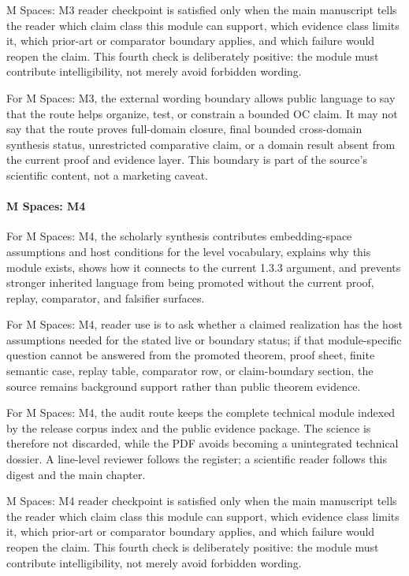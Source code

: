 M Spaces: M3 reader checkpoint is satisfied only when the main manuscript tells the reader which claim class this module can support, which evidence class limits it, which prior-art or comparator boundary applies, and which failure would reopen the claim. This fourth check is deliberately positive: the module must contribute intelligibility, not merely avoid forbidden wording.


For M Spaces: M3, the external wording boundary allows public language to say that the route helps organize, test, or constrain a bounded OC claim. It may not say that the route proves full-domain closure, final bounded cross-domain synthesis status, unrestricted comparative claim, or a domain result absent from the current proof and evidence layer. This boundary is part of the source's scientific content, not a marketing caveat.


\paragraph{M Spaces: M4}

For M Spaces: M4, the scholarly synthesis contributes embedding-space assumptions and host conditions for the level vocabulary, explains why this module exists, shows how it connects to the current 1.3.3 argument, and prevents stronger inherited language from being promoted without the current proof, replay, comparator, and falsifier surfaces.


For M Spaces: M4, reader use is to ask whether a claimed realization has the host assumptions needed for the stated live or boundary status; if that module-specific question cannot be answered from the promoted theorem, proof sheet, finite semantic case, replay table, comparator row, or claim-boundary section, the source remains background support rather than public theorem evidence.


For M Spaces: M4, the audit route keeps the complete technical module indexed by the release corpus index and the public evidence package. The science is therefore not discarded, while the PDF avoids becoming a unintegrated technical dossier. A line-level reviewer follows the register; a scientific reader follows this digest and the main chapter.


M Spaces: M4 reader checkpoint is satisfied only when the main manuscript tells the reader which claim class this module can support, which evidence class limits it, which prior-art or comparator boundary applies, and which failure would reopen the claim. This fourth check is deliberately positive: the module must contribute intelligibility, not merely avoid forbidden wording.


